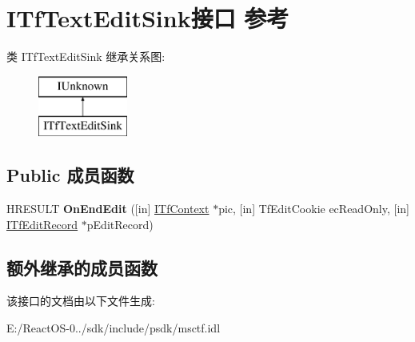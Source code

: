 \hypertarget{interface_i_tf_text_edit_sink}{}\section{I\+Tf\+Text\+Edit\+Sink接口 参考}
\label{interface_i_tf_text_edit_sink}
类 I\+Tf\+Text\+Edit\+Sink 继承关系图\+:\begin{figure}[H]
\begin{center}
\leavevmode
\includegraphics[height=2.000000cm]{interface_i_tf_text_edit_sink}
\end{center}
\end{figure}
\subsection*{Public 成员函数}
\begin{DoxyCompactItemize}
\item 
\mbox{\label{interface_i_tf_text_edit_sink_a2add5e3050f7128868e9b4490cc7296b}} 
H\+R\+E\+S\+U\+LT {\bfseries On\+End\+Edit} (\mbox{[}in\mbox{]} \hyperlink{interface_i_tf_context}{I\+Tf\+Context} $\ast$pic, \mbox{[}in\mbox{]} Tf\+Edit\+Cookie ec\+Read\+Only, \mbox{[}in\mbox{]} \hyperlink{interface_i_tf_edit_record}{I\+Tf\+Edit\+Record} $\ast$p\+Edit\+Record)
\end{DoxyCompactItemize}
\subsection*{额外继承的成员函数}


该接口的文档由以下文件生成\+:\begin{DoxyCompactItemize}
\item 
E\+:/\+React\+O\+S-\/0../sdk/include/psdk/msctf.\+idl\end{DoxyCompactItemize}
